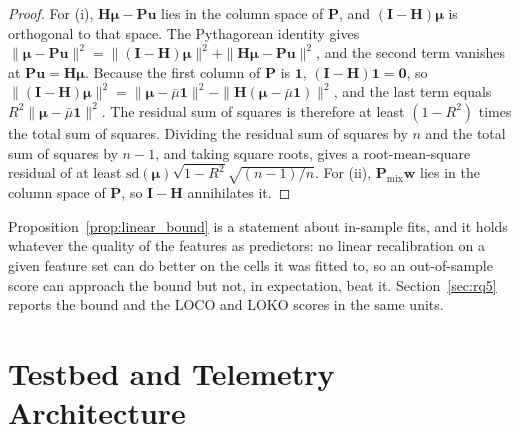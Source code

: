 \documentclass{ws-jcsc}
\begin{document}
\begin{proof}
For (i), $\mathbf{H}\boldsymbol{\mu}-\mathbf{P}\mathbf{u}$ lies in the column space of $\mathbf{P}$, and $(\mathbf{I}-\mathbf{H})\boldsymbol{\mu}$ is orthogonal to that space. The Pythagorean identity gives $\|\boldsymbol{\mu}-\mathbf{P}\mathbf{u}\|^2=\|(\mathbf{I}-\mathbf{H})\boldsymbol{\mu}\|^2+\|\mathbf{H}\boldsymbol{\mu}-\mathbf{P}\mathbf{u}\|^2$, and the second term vanishes at $\mathbf{P}\mathbf{u}=\mathbf{H}\boldsymbol{\mu}$. Because the first column of $\mathbf{P}$ is $\mathbf{1}$, $(\mathbf{I}-\mathbf{H})\mathbf{1}=\mathbf{0}$, so $\|(\mathbf{I}-\mathbf{H})\boldsymbol{\mu}\|^2=\|\boldsymbol{\mu}-\bar{\mu}\mathbf{1}\|^2-\|\mathbf{H}(\boldsymbol{\mu}-\bar{\mu}\mathbf{1})\|^2$, and the last term equals $R^2\|\boldsymbol{\mu}-\bar{\mu}\mathbf{1}\|^2$. The residual sum of squares is therefore at least $(1-R^2)$ times the total sum of squares. Dividing the residual sum of squares by $n$ and the total sum of squares by $n-1$, and taking square roots, gives a root-mean-square residual of at least $\mathrm{sd}(\boldsymbol{\mu})\sqrt{1-R^2}\sqrt{(n-1)/n}$. For (ii), $\mathbf{P}_{\mathrm{mix}}\mathbf{w}$ lies in the column space of $\mathbf{P}$, so $\mathbf{I}-\mathbf{H}$ annihilates it.
\end{proof}

Proposition~\ref{prop:linear_bound} is a statement about in-sample fits, and it holds whatever the quality of the features as predictors: no linear recalibration on a given feature set can do better on the cells it was fitted to, so an out-of-sample score can approach the bound but not, in expectation, beat it. Section~\ref{sec:rq5} reports the bound and the LOCO and LOKO scores in the same units.

\section{Testbed and Telemetry Architecture}
\label{sec:methods}
\end{document}
